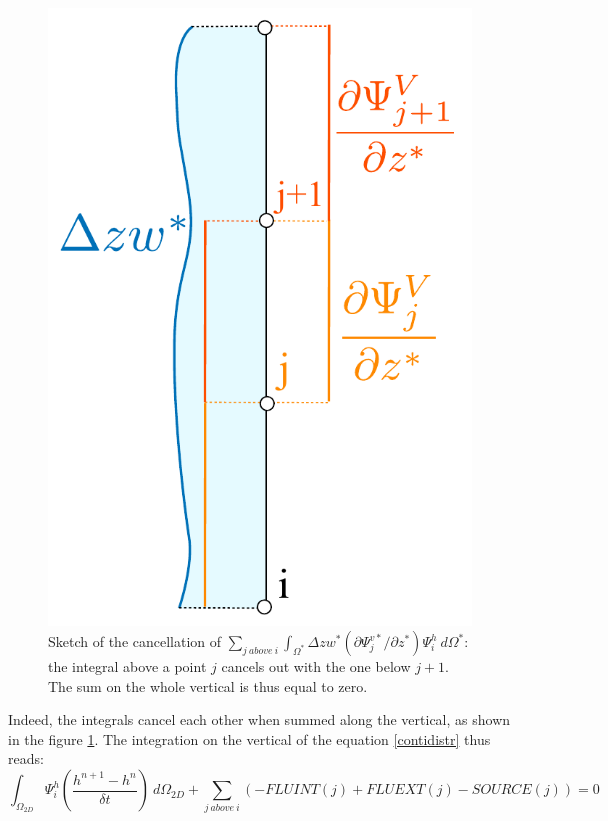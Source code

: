 \begin{figure}[t]
\begin{center}
\includegraphics[scale=0.5]{graphics/fluvert.pdf}
\end{center}
\caption{Sketch of the cancellation of $\displaystyle{\sum_{j~above~i}}\displaystyle{\int_{\Omega^{\ast}}}\Delta zw^{\ast}
(\partial\Psi_{j}^{v\ast}/\partial z^{\ast})\Psi_{i}^{h}~d\Omega^{\ast}$: the
integral above a point $j$ cancels out with the one below $j+1$. The sum on
the whole vertical is thus equal to zero.}
\label{fig:fluvert}
\end{figure}
Indeed, the integrals cancel each other when summed along the vertical,
as shown in the figure \ref{fig:fluvert}.
The integration on the vertical of the equation \eqref{contidistr} thus reads:
\begin{equation}
\displaystyle{\int_{\Omega_{2D}}}\Psi_{i}^{h}\left(\dfrac{h^{n+1}-h^{n}}{\delta
t}\right)~d\Omega_{2D}+{\displaystyle\sum_{j~above~i}}
\left(-FLUINT(j)+FLUEXT(j)-SOURCE(j)\right)  =0
\end{equation}
